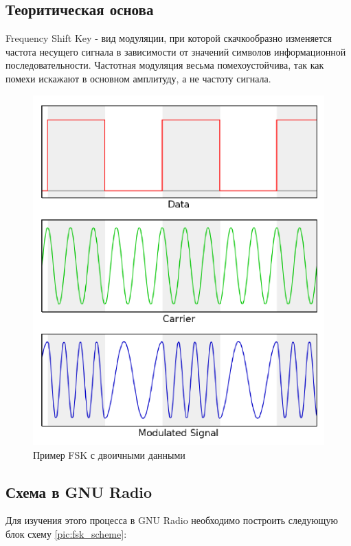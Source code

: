 \subsection{Теоритическая основа}

\qquad Frequency Shift Key - вид модуляции, при которой скачкообразно изменяется частота несущего сигнала в зависимости от значений символов информационной последовательности. Частотная модуляция весьма помехоустойчива, так как помехи искажают в основном амплитуду, а не частоту сигнала.

\begin{figure}[H]
	\begin{center}
		\includegraphics[scale=1]{fig/lab12/lab12_01.png}
		\caption{Пример FSK с двоичными данными}
	\end{center}
\end{figure}

\subsection{Схема в GNU Radio}    
    Для изучения этого процесса в GNU Radio необходимо построить следующую блок схему \ref{pic:fsk_scheme}:
    
